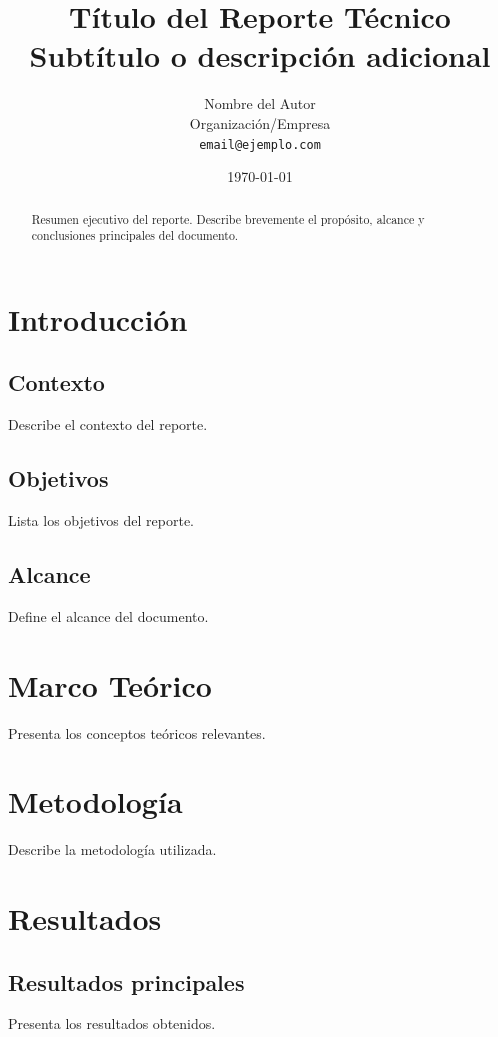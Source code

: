 \documentclass[12pt, a4paper]{report}
\title{
    \textbf{Título del Reporte Técnico} \\
    \large Subtítulo o descripción adicional
}
\author{
    Nombre del Autor \\
    Organización/Empresa \\
    \texttt{email@ejemplo.com}
}
\date{\today}
\begin{document}
\maketitle

\begin{abstract}
Resumen ejecutivo del reporte. Describe brevemente el propósito, alcance y conclusiones principales del documento.
\end{abstract}

\tableofcontents
\listoffigures
\listoftables

\chapter{Introducción}

\section{Contexto}
Describe el contexto del reporte.

\section{Objetivos}
Lista los objetivos del reporte.

\section{Alcance}
Define el alcance del documento.

\chapter{Marco Teórico}

Presenta los conceptos teóricos relevantes.

\chapter{Metodología}

Describe la metodología utilizada.

\chapter{Resultados}

\section{Resultados principales}
Presenta los resultados obtenidos.
\end{document}
